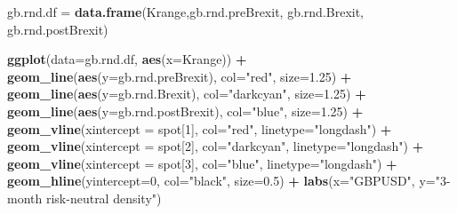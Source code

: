 \documentclass[]{book}
\newenvironment{Shaded}{\begin{snugshade}}{\end{snugshade}}
\newcommand{\KeywordTok}[1]{\textcolor[rgb]{0.13,0.29,0.53}{\textbf{#1}}}
\newcommand{\DataTypeTok}[1]{\textcolor[rgb]{0.13,0.29,0.53}{#1}}
\newcommand{\DecValTok}[1]{\textcolor[rgb]{0.00,0.00,0.81}{#1}}
\newcommand{\FloatTok}[1]{\textcolor[rgb]{0.00,0.00,0.81}{#1}}
\newcommand{\StringTok}[1]{\textcolor[rgb]{0.31,0.60,0.02}{#1}}
\newcommand{\OperatorTok}[1]{\textcolor[rgb]{0.81,0.36,0.00}{\textbf{#1}}}
\newcommand{\NormalTok}[1]{#1}
\theoremstyle{definition}
\theoremstyle{definition}
\theoremstyle{definition}
\theoremstyle{remark}
\begin{document}
\begin{Shaded}
\begin{Highlighting}[]
\NormalTok{gb.rnd.df =}\StringTok{ }\KeywordTok{data.frame}\NormalTok{(Krange,gb.rnd.preBrexit, gb.rnd.Brexit, gb.rnd.postBrexit)}

\KeywordTok{ggplot}\NormalTok{(}\DataTypeTok{data=}\NormalTok{gb.rnd.df, }\KeywordTok{aes}\NormalTok{(}\DataTypeTok{x=}\NormalTok{Krange)) }\OperatorTok{+}\StringTok{ }\KeywordTok{geom_line}\NormalTok{(}\KeywordTok{aes}\NormalTok{(}\DataTypeTok{y=}\NormalTok{gb.rnd.preBrexit), }\DataTypeTok{col=}\StringTok{"red"}\NormalTok{, }\DataTypeTok{size=}\FloatTok{1.25}\NormalTok{) }\OperatorTok{+}
\StringTok{  }\KeywordTok{geom_line}\NormalTok{(}\KeywordTok{aes}\NormalTok{(}\DataTypeTok{y=}\NormalTok{gb.rnd.Brexit), }\DataTypeTok{col=}\StringTok{"darkcyan"}\NormalTok{, }\DataTypeTok{size=}\FloatTok{1.25}\NormalTok{) }\OperatorTok{+}
\StringTok{  }\KeywordTok{geom_line}\NormalTok{(}\KeywordTok{aes}\NormalTok{(}\DataTypeTok{y=}\NormalTok{gb.rnd.postBrexit), }\DataTypeTok{col=}\StringTok{"blue"}\NormalTok{, }\DataTypeTok{size=}\FloatTok{1.25}\NormalTok{) }\OperatorTok{+}
\StringTok{  }\KeywordTok{geom_vline}\NormalTok{(}\DataTypeTok{xintercept =}\NormalTok{ spot[}\DecValTok{1}\NormalTok{], }\DataTypeTok{col=}\StringTok{"red"}\NormalTok{, }\DataTypeTok{linetype=}\StringTok{"longdash"}\NormalTok{) }\OperatorTok{+}\StringTok{ }
\StringTok{  }\KeywordTok{geom_vline}\NormalTok{(}\DataTypeTok{xintercept =}\NormalTok{ spot[}\DecValTok{2}\NormalTok{], }\DataTypeTok{col=}\StringTok{"darkcyan"}\NormalTok{, }\DataTypeTok{linetype=}\StringTok{"longdash"}\NormalTok{) }\OperatorTok{+}
\StringTok{  }\KeywordTok{geom_vline}\NormalTok{(}\DataTypeTok{xintercept =}\NormalTok{ spot[}\DecValTok{3}\NormalTok{], }\DataTypeTok{col=}\StringTok{"blue"}\NormalTok{, }\DataTypeTok{linetype=}\StringTok{"longdash"}\NormalTok{) }\OperatorTok{+}
\StringTok{  }\KeywordTok{geom_hline}\NormalTok{(}\DataTypeTok{yintercept=}\DecValTok{0}\NormalTok{, }\DataTypeTok{col=}\StringTok{"black"}\NormalTok{, }\DataTypeTok{size=}\FloatTok{0.5}\NormalTok{) }\OperatorTok{+}
\StringTok{  }\KeywordTok{labs}\NormalTok{(}\DataTypeTok{x=}\StringTok{"GBPUSD"}\NormalTok{, }\DataTypeTok{y=}\StringTok{"3-month risk-neutral density"}\NormalTok{)   }
\end{Highlighting}
\end{Shaded}
\end{document}
